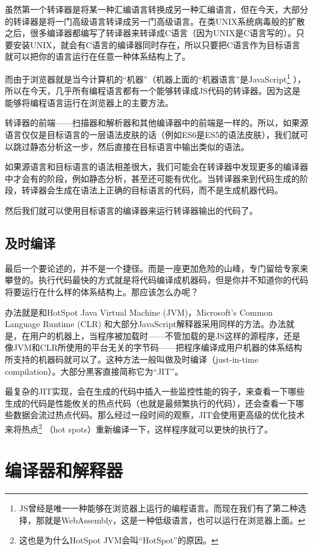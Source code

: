 \documentclass[cn,10pt,math=newtx,citestyle=gb7714-2015,bibstyle=gb7714-2015]{elegantbook}
\begin{document}
虽然第一个转译器是将某一种汇编语言转换成另一种汇编语言，但在今天，大部分的转译器是将一门高级语言转译成另一门高级语言。在类UNIX系统病毒般的扩散之后，很多编译器都编写了转译器来转译成C语言（因为UNIX是C语言写的）。只要安装UNIX，就会有C语言的编译器同时存在，所以只要把C语言作为目标语言就可以把你的语言运行在任意一种体系结构上了。

而由于浏览器就是当今计算机的“机器”（机器上面的“机器语言”是JavaScript\footnote{JS曾经是唯一一种能够在浏览器上运行的编程语言。而现在我们有了第二种选择，那就是WebAssembly，这是一种低级语言，也可以运行在浏览器上面。} ），所以在今天，几乎所有编程语言都有一个能够转译成JS代码的转译器。因为这是能够将编程语言运行在浏览器上的主要方法。

转译器的前端——扫描器和解析器和其他编译器中的前端是一样的。所以，如果源语言仅仅是目标语言的一层语法皮肤的话（例如ES6是ES5的语法皮肤），我们就可以跳过静态分析这一步，然后直接在目标语言中输出类似的语法。

如果源语言和目标语言的语法相差很大，我们可能会在转译器中发现更多的编译器中才会有的阶段，例如静态分析，甚至还可能有优化。当转译器来到代码生成的阶段，转译器会生成在语法上正确的目标语言的代码，而不是生成机器代码。

然后我们就可以使用目标语言的编译器来运行转译器输出的代码了。

\subsection{及时编译}

最后一个要论述的，并不是一个捷径。而是一座更加危险的山峰，专门留给专家来攀登的。执行代码最快的方式就是将代码编译成机器码，但是你并不知道你的代码将要运行在什么样的体系结构上。那应该怎么办呢？

办法就是和HotSpot Java Virtual Machine (JVM)，Microsoft’s Common Language Runtime (CLR) 和大部分JavaScript解释器采用同样的方法。办法就是，在用户的机器上，当程序被加载时——不管加载的是JS这样的源程序，还是像JVM和CLR所使用的平台无关的字节码——把程序编译成用户机器的体系结构所支持的机器码就可以了。这种方法一般叫做及时编译（just-in-time compilation）。大部分黑客直接简称它为“JIT”。

最复杂的JIT实现，会在生成的代码中插入一些监控性能的钩子，来查看一下哪些生成的代码是性能攸关的热点代码（也就是最频繁执行的代码），还会查看一下哪些数据会流过热点代码。那么经过一段时间的观察，JIT会使用更高级的优化技术来将热点\footnote{这也是为什么HotSpot JVM会叫“HotSpot”的原因。} （hot spots）重新编译一下，这样程序就可以更快的执行了。

\section{编译器和解释器}
\end{document}
